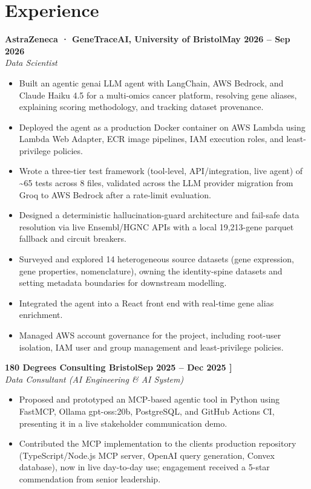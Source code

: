 \documentclass[a4paper,11pt]{article}
\newcommand{\entry}[4]{\needspace{4\baselineskip}\noindent\textbf{#1}\hfill\textbf{#2}\\ \textit{#3}\hfill\textit{#4}\par}
\begin{document}
\section{Experience}
\entry{AstraZeneca · GeneTraceAI, University of Bristol}{May 2026 – Sep 2026}{Data Scientist}{}
\begin{itemize}
  \item Built an agentic genai LLM agent with LangChain, AWS Bedrock, and Claude Haiku 4.5 for a multi-omics cancer platform, resolving gene aliases, explaining scoring methodology, and tracking dataset provenance.
  \item Deployed the agent as a production Docker container on AWS Lambda using Lambda Web Adapter, ECR image pipelines, IAM execution roles, and least-privilege policies.
  \item Wrote a three-tier test framework (tool-level, API/integration, live agent) of \textasciitilde{}65 tests across 8 files, validated across the LLM provider migration from Groq to AWS Bedrock after a rate-limit evaluation.
  \item Designed a deterministic hallucination-guard architecture and fail-safe data resolution via live Ensembl/HGNC APIs with a local 19,213-gene parquet fallback and circuit breakers.
  \item Surveyed and explored 14 heterogeneous source datasets (gene expression, gene properties, nomenclature), owning the identity-spine datasets and setting metadata boundaries for downstream modelling.
  \item Integrated the agent into a React front end with real-time gene alias enrichment.
  \item Managed AWS account governance for the project, including root-user isolation, IAM user and group management and least-privilege policies.
\end{itemize}
\vspace{4pt}
\entry{180 Degrees Consulting Bristol}{Sep 2025 – Dec 2025   ]}{Data Consultant (AI Engineering \& AI System)}{}
\begin{itemize}
  \item Proposed and prototyped an MCP-based agentic tool in Python using FastMCP, Ollama gpt-oss:20b, PostgreSQL, and GitHub Actions CI, presenting it in a live stakeholder communication demo.
  \item Contributed the MCP implementation to the client\textquotesingle{}s production repository (TypeScript/Node.js MCP server, OpenAI query generation, Convex database), now in live day-to-day use; engagement received a 5-star commendation from senior leadership.
\end{itemize}
\end{document}
